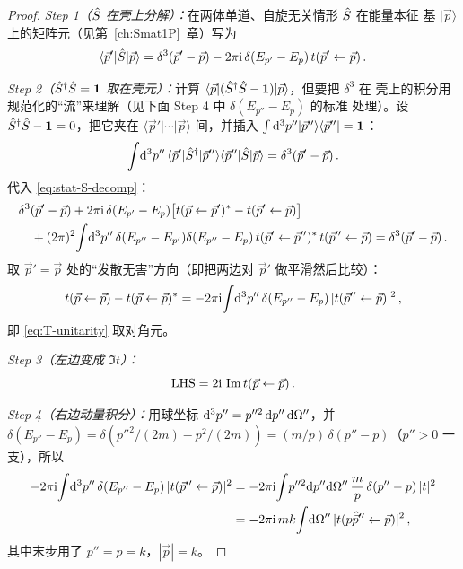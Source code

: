 \begin{proof}
\textit{Step 1（$\hat{S}$ 在壳上分解）：}在两体单道、自旋无关情形 $\hat{S}$ 在能量本征
基 $|\vec p\rangle$ 上的矩阵元（见第~\ref{ch:Smat1P}~章）写为
\begin{equation}
  \langle\vec p'|\hat{S}|\vec p\rangle = \delta^3(\vec p'-\vec p)
  - 2\pi\mathrm{i}\,\delta(E_{p'}-E_p)\,t(\vec p'\leftarrow\vec p)\,.
  \label{eq:stat-S-decomp}
\end{equation}

\textit{Step 2（$\hat{S}^\dagger\hat{S}=\mathbf{1}$ 取在壳元）：}计算
$\langle\vec p|(\hat{S}^\dagger\hat{S}-\mathbf{1})|\vec p\rangle$，但要把 $\delta^3$ 在
壳上的积分用规范化的``流''来理解（见下面 Step 4 中 $\delta(E_{p''}-E_p)$ 的标准
处理）。设 $\hat{S}^\dagger\hat{S}-\mathbf{1}=0$，把它夹在 $\langle\vec p'|\cdots|\vec p\rangle$
间，并插入 $\int\mathrm{d}^3p''|\vec p''\rangle\langle\vec p''|=\mathbf{1}$：
\begin{equation}
  \int\!\mathrm{d}^3p''\,\langle\vec p'|\hat{S}^\dagger|\vec p''\rangle
  \langle\vec p''|\hat{S}|\vec p\rangle
  = \delta^3(\vec p'-\vec p)\,.
  \label{eq:stat-Sdag-S}
\end{equation}
代入 \eqref{eq:stat-S-decomp}：
\begin{align}
  &\delta^3(\vec p'-\vec p)
   + 2\pi\mathrm{i}\,\delta(E_{p'}-E_p)\big[t(\vec p\leftarrow\vec p')^* - t(\vec p'\leftarrow\vec p)\big]\nonumber\\
  &\quad + (2\pi)^2\!\int\!\mathrm{d}^3p''\,\delta(E_{p''}-E_{p'})\delta(E_{p''}-E_p)\,
     t(\vec p'\leftarrow\vec p'')^*\,t(\vec p''\leftarrow\vec p)
   = \delta^3(\vec p'-\vec p)\,.
\end{align}
取 $\vec p'=\vec p$ 处的``发散无害''方向（即把两边对 $\vec p'$ 做平滑然后比较）：
\begin{equation}
  t(\vec p\leftarrow\vec p) - t(\vec p\leftarrow\vec p)^*
  = -2\pi\mathrm{i}\!\int\!\mathrm{d}^3p''\,\delta(E_{p''}-E_p)\,|t(\vec p''\leftarrow\vec p)|^2\,,
  \label{eq:stat-T-Tdag-onshell}
\end{equation}
即 \eqref{eq:T-unitarity} 取对角元。

\textit{Step 3（左边变成 $\Im t$）：}
\begin{equation}
  \mathrm{LHS} = 2\mathrm{i}\,\Im t(\vec p\leftarrow\vec p)\,.
  \label{eq:stat-LHS}
\end{equation}

\textit{Step 4（右边动量积分）：}用球坐标
$\mathrm{d}^3p'' = p''^2\,\mathrm{d} p''\,\mathrm{d}\Omega''$，并 $\delta(E_{p''}-E_p) = \delta(p''^2/(2m)-p^2/(2m))
= (m/p)\,\delta(p''-p)$（$p''>0$ 一支），所以
\begin{align}
  -2\pi\mathrm{i}\!\int\!\mathrm{d}^3p''\,\delta(E_{p''}-E_p)\,|t(\vec p''\leftarrow\vec p)|^2
  &= -2\pi\mathrm{i}\!\int\!p''^2\mathrm{d} p''\mathrm{d}\Omega''\,
     \frac{m}{p}\,\delta(p''-p)\,|t|^2\nonumber\\
  &= -2\pi\mathrm{i}\,m k\!\int\!\mathrm{d}\Omega''\,|t(p\hat{\vec p}''\leftarrow\vec p)|^2\,,
  \label{eq:stat-RHS}
\end{align}
其中末步用了 $p''=p=k$，$|\vec p|=k$。


\end{proof}
